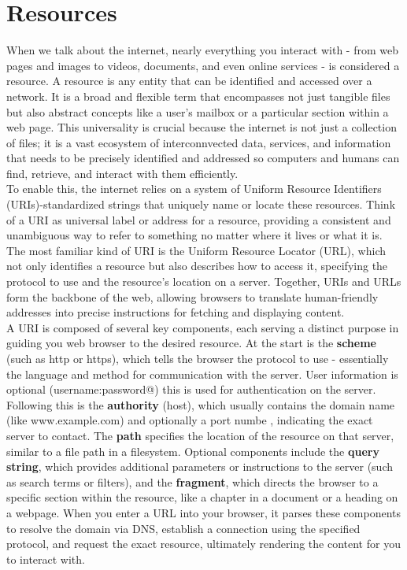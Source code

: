 \documentclass{article}
\begin{document}
\section*{Resources}
When we talk about the internet, nearly everything you interact with - from web pages and images to videos, documents, and even online services - is considered a resource. A resource is any entity that can be identified and accessed over a network. It is a broad and flexible term that encompasses not just tangible files but also abstract concepts like a user's mailbox or a particular section within a web page. This universality is crucial because the internet is not just a collection of files; it is a vast ecosystem of interconnvected data, services, and information that needs to be precisely identified and addressed so computers and humans can find, retrieve, and interact with them efficiently.\\

To enable this, the internet relies on a system of Uniform Resource Identifiers (URIs)-standardized strings that uniquely name or locate these resources. Think of a URI as universal label or address for a resource, providing a consistent and unambiguous way to refer to something no matter where it lives or what it is. The most familiar kind of URI is the Uniform Resource Locator (URL), which not only identifies a resource but also describes how to access it, specifying the protocol to use and the resource's location on a server. Together, URIs and URLs form the backbone of the web, allowing browsers to translate human-friendly addresses into precise instructions for fetching and displaying content.\\

A URI is composed of several key components, each serving a distinct purpose in guiding you web browser to the desired resource. At the start is the \textbf{scheme} (such as http or https), which tells the browser the protocol to use - essentially the language and method for communication with the server. User information is optional (username:password@) this is used for authentication on the server. Following this is the \textbf{authority} (host), which usually contains the domain name (like www.example.com) and optionally a port numbe , indicating the exact server to contact. The \textbf{path} specifies the location of the resource on that server, similar to a file path in a filesystem. Optional components include the \textbf{query string}, which provides additional parameters or instructions to the server (such as search terms or filters), and the \textbf{fragment}, which directs the browser to a specific section within the resource, like a chapter in a document or a heading on a webpage. When you enter a URL into your browser, it parses these components to resolve the domain via DNS, establish a connection using the specified protocol, and request the exact resource, ultimately rendering the content for you to interact with.
\end{document}

